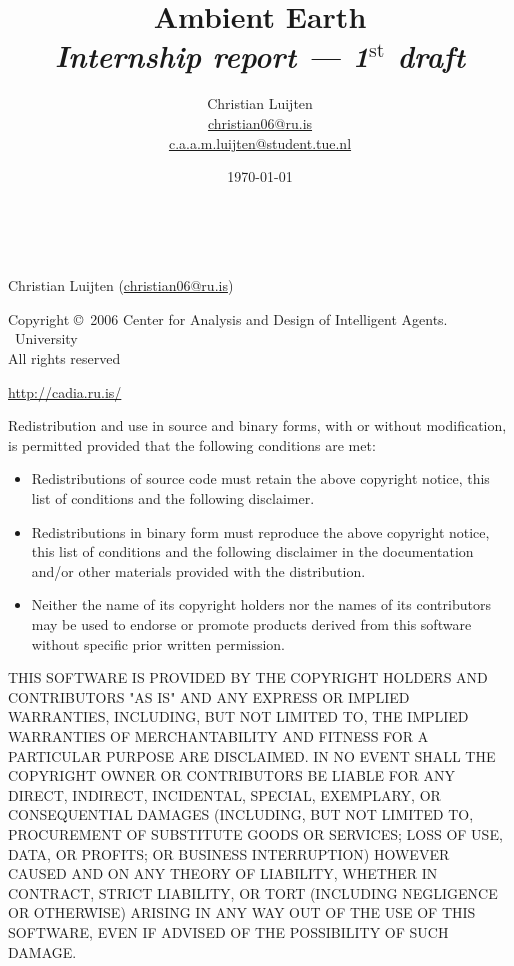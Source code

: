 \documentclass[english,a4paper,twoside]{scrreprt}
\title{Ambient Earth\\
       {\Large \emph{Internship report --- 1$^{\text{st}}$ draft\/}}}
\author{Christian Luijten\\\url{christian06@ru.is}\\\url{c.a.a.m.luijten@student.tue.nl}}
\date{\today}
\begin{document}

\maketitle

\mbox{} \\
\vfill

\begin{adjustwidth}{4em}{4em}
{\scriptsize
  Christian Luijten (\url{christian06@ru.is})

  Copyright \copyright\ 2006 Center for Analysis and Design of Intelligent
  Agents. \\
  \Rvk\ University \\
  All rights reserved

  \url{http://cadia.ru.is/}

  Redistribution and use in source and binary forms, with or without
  modification, is permitted provided that the following conditions are met:

  \begin{itemize}
    \item Redistributions of source code must retain the above copyright
      notice, this list of conditions and the following disclaimer.

    \item Redistributions in binary form must reproduce the above copyright
      notice, this list of conditions and the following disclaimer in the
      documentation and/or other materials provided with the distribution.

    \item Neither the name of its copyright holders nor the names of its
      contributors may be used to endorse or promote products derived from this
      software without specific prior written permission.

  \end{itemize}

  THIS SOFTWARE IS PROVIDED BY THE COPYRIGHT HOLDERS AND CONTRIBUTORS "AS IS"
  AND ANY EXPRESS OR IMPLIED WARRANTIES, INCLUDING, BUT NOT LIMITED TO, THE
  IMPLIED WARRANTIES OF MERCHANTABILITY AND FITNESS FOR A PARTICULAR PURPOSE
  ARE DISCLAIMED. IN NO EVENT SHALL THE COPYRIGHT OWNER OR CONTRIBUTORS BE
  LIABLE FOR ANY DIRECT, INDIRECT, INCIDENTAL, SPECIAL, EXEMPLARY, OR
  CONSEQUENTIAL DAMAGES (INCLUDING, BUT NOT LIMITED TO, PROCUREMENT OF
  SUBSTITUTE GOODS OR SERVICES; LOSS OF USE, DATA, OR PROFITS; OR BUSINESS
  INTERRUPTION) HOWEVER CAUSED AND ON ANY THEORY OF LIABILITY, WHETHER IN
  CONTRACT, STRICT LIABILITY, OR TORT (INCLUDING NEGLIGENCE OR OTHERWISE)
  ARISING IN ANY WAY OUT OF THE USE OF THIS SOFTWARE, EVEN IF ADVISED OF THE
  POSSIBILITY OF SUCH DAMAGE.
}
\end{adjustwidth}
\end{document}
